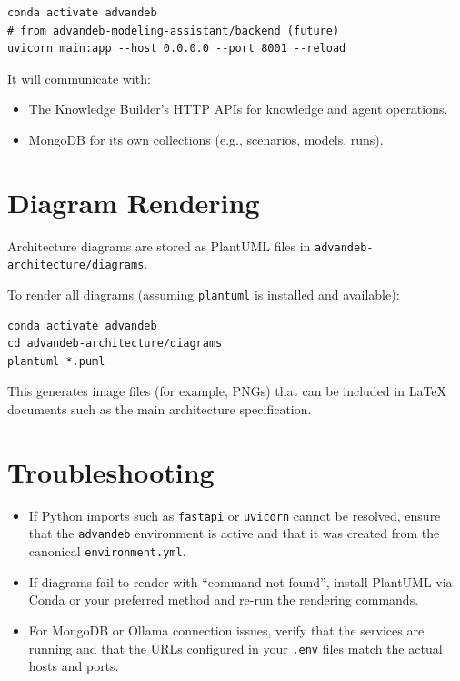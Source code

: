 \documentclass[11pt]{article}
\begin{document}
\begin{verbatim}
conda activate advandeb
# from advandeb-modeling-assistant/backend (future)
uvicorn main:app --host 0.0.0.0 --port 8001 --reload
\end{verbatim}

It will communicate with:

\begin{itemize}[noitemsep]
  \item The Knowledge Builder's HTTP APIs for knowledge and agent operations.
  \item MongoDB for its own collections (e.g., scenarios, models, runs).
\end{itemize}

\section{Diagram Rendering}

Architecture diagrams are stored as PlantUML files in \texttt{advandeb-architecture/diagrams}.

To render all diagrams (assuming \texttt{plantuml} is installed and available):

\begin{verbatim}
conda activate advandeb
cd advandeb-architecture/diagrams
plantuml *.puml
\end{verbatim}

This generates image files (for example, PNGs) that can be included in LaTeX documents such as the main architecture specification.

\section{Troubleshooting}

\begin{itemize}[noitemsep]
  \item If Python imports such as \texttt{fastapi} or \texttt{uvicorn} cannot be resolved, ensure that the \texttt{advandeb} environment is active and that it was created from the canonical \texttt{environment.yml}.
  \item If diagrams fail to render with ``command not found'', install PlantUML via Conda or your preferred method and re-run the rendering commands.
  \item For MongoDB or Ollama connection issues, verify that the services are running and that the URLs configured in your \texttt{.env} files match the actual hosts and ports.
\end{itemize}
\end{document}
